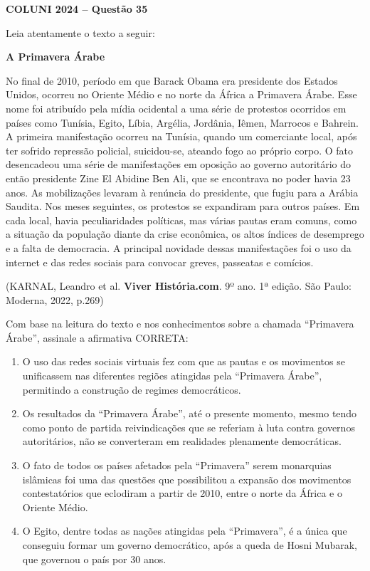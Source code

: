 \textbf{COLUNI 2024 -- Questão 35}\par\medskip Leia atentamente o texto a seguir:

\par

\begin{center}\textbf{A Primavera Árabe}\end{center}

\par

No final de 2010, período em que Barack Obama era presidente dos Estados Unidos, ocorreu no Oriente Médio e no norte da África a Primavera Árabe. Esse nome foi atribuído pela mídia ocidental a uma série de protestos ocorridos em países como Tunísia, Egito, Líbia, Argélia, Jordânia, Iêmen, Marrocos e Bahrein. A primeira manifestação ocorreu na Tunísia, quando um comerciante local, após ter sofrido repressão policial, suicidou-se, ateando fogo ao próprio corpo. O fato desencadeou uma série de manifestações em oposição ao governo autoritário do então presidente Zine El Abidine Ben Ali, que se encontrava no poder havia 23 anos. As mobilizações levaram à renúncia do presidente, que fugiu para a Arábia Saudita. Nos meses seguintes, os protestos se expandiram para outros países. Em cada local, havia peculiaridades políticas, mas várias pautas eram comuns, como a situação da população diante da crise econômica, os altos índices de desemprego e a falta de democracia. A principal novidade dessas manifestações foi o uso da internet e das redes sociais para convocar greves, passeatas e comícios.

\par

(KARNAL, Leandro et al. \textbf{Viver História.com}. 9º ano. 1ª edição. São Paulo: Moderna, 2022, p.269)

\par

Com base na leitura do texto e nos conhecimentos sobre a chamada “Primavera Árabe”, assinale a afirmativa CORRETA:\begin{enumerate}
\item O uso das redes sociais virtuais fez com que as pautas e os movimentos se unificassem nas diferentes
        regiões atingidas pela “Primavera Árabe”, permitindo a construção de regimes democráticos.
\item Os resultados da “Primavera Árabe”, até o presente momento, mesmo tendo como ponto de partida
        reivindicações que se referiam à luta contra governos autoritários, não se converteram em realidades
        plenamente democráticas.
\item O fato de todos os países afetados pela “Primavera” serem monarquias islâmicas foi uma das questões
        que possibilitou a expansão dos movimentos contestatórios que eclodiram a partir de 2010, entre o norte
        da África e o Oriente Médio.
\item O Egito, dentre todas as nações atingidas pela “Primavera”, é a única que conseguiu formar um governo
        democrático, após a queda de Hosni Mubarak, que governou o país por 30 anos.\end{enumerate}
